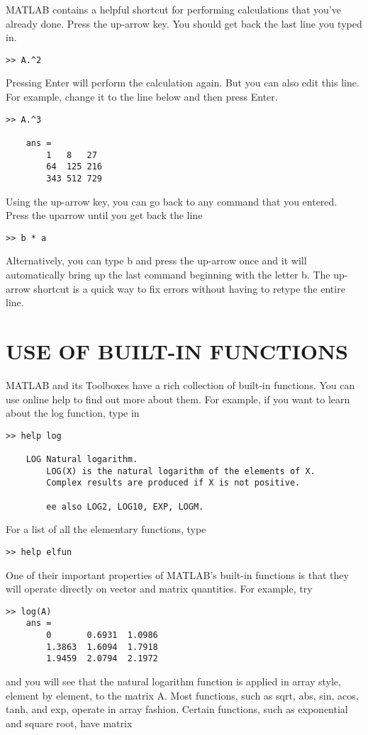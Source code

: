 \documentclass[../main.tex]{subfiles}
\begin{document}
MATLAB contains a helpful shortcut for performing calculations that you've already
done. Press the up-arrow key. You should get back the last line you typed in.
\begin{lstlisting}[frame=none, numbers=none]
	>> A.^2
\end{lstlisting}
Pressing Enter will perform the calculation again. But you can also edit this line. For
example, change it to the line below and then press Enter.
\begin{lstlisting}[frame=none, numbers=none]
	>> A.^3

	ans =
		1 	8 	27
		64 	125	216
		343	512	729
\end{lstlisting}
Using the up-arrow key, you can go back to any command that you entered. Press the uparrow until you get back the line
\begin{lstlisting}[frame=none, numbers=none]
	>> b * a
\end{lstlisting}
Alternatively, you can type b and press the up-arrow once and it will automatically bring
up the last command beginning with the letter b. The up-arrow shortcut is a quick way to
fix errors without having to retype the entire line.


\section{USE OF BUILT-IN FUNCTIONS}

MATLAB and its Toolboxes have a rich collection of built-in functions. You can use online
help to find out more about them. For example, if you want to learn about the log function,
type in
\begin{lstlisting}[frame=none, numbers=none]
	>> help log

	LOG Natural logarithm.
		LOG(X) is the natural logarithm of the elements of X.
		Complex results are produced if X is not positive.

		ee also LOG2, LOG10, EXP, LOGM.
\end{lstlisting}
For a list of all the elementary functions, type
\begin{lstlisting}[frame=none, numbers=none]
	>> help elfun
\end{lstlisting}
One of their important properties of MATLAB's built-in functions is that they will operate directly on vector and matrix quantities. For example, try
\begin{lstlisting}[frame=none, numbers=none]
	>> log(A)
	ans =
		0 		0.6931	1.0986
		1.3863 	1.6094	1.7918
		1.9459 	2.0794	2.1972
\end{lstlisting}
and you will see that the natural logarithm function is applied in array style, element by
element, to the matrix A. Most functions, such as sqrt, abs, sin, acos, tanh, and exp, operate 
in array fashion. Certain functions, such as exponential and square root, have matrix
\end{document}
